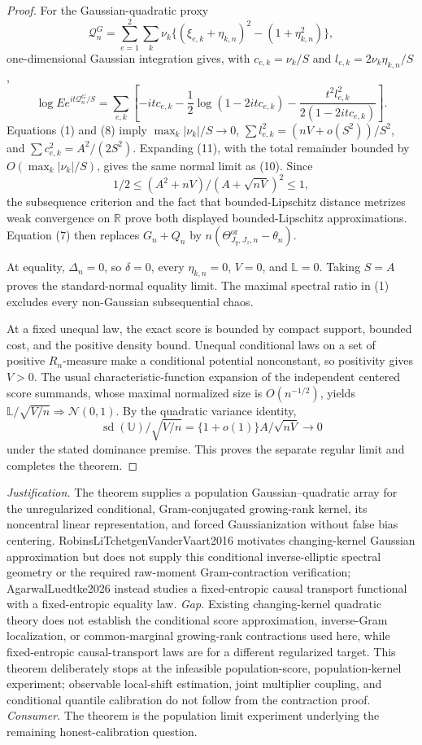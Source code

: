 \documentclass{article}
\begin{document}
\begin{proof}
For the Gaussian-quadratic proxy
\[
\mathcal Q_n^G=\sum_{e=1}^2\sum_k\nu_k
\{(\xi_{e,k}+\eta_{k,n})^2-(1+\eta_{k,n}^2)\},
\]
one-dimensional Gaussian integration gives, with \(c_{e,k}=\nu_k/S\) and \(l_{e,k}=2\nu_k\eta_{k,n}/S\),
\[
\log Ee^{it\mathcal Q_n^G/S}
=\sum_{e,k}\left[-itc_{e,k}-\frac12\log(1-2itc_{e,k})
-\frac{t^2l_{e,k}^2}{2(1-2itc_{e,k})}\right]. \tag{11}
\]
Equations (1) and (8) imply \(\max_k|\nu_k|/S\to0\), \(\sum l_{e,k}^2=(nV+o(S^2))/S^2\), and \(\sum c_{e,k}^2=A^2/(2S^2)\).  Expanding (11), with the total remainder bounded by \(O(\max_k|\nu_k|/S)\), gives the same normal limit as (10).  Since
\[
1/2\le(A^2+nV)/(A+\sqrt{nV})^2\le1, \tag{12}
\]
the subsequence criterion and the fact that bounded-Lipschitz distance metrizes weak convergence on \(\mathbb R\) prove both displayed bounded-Lipschitz approximations.  Equation (7) then replaces \(G_n+Q_n\) by \(n(\Theta^{\mathrm{or}}_{J_y,J_z,n}-\theta_n)\).

At equality, \(\Delta_n=0\), so \(\delta=0\), every \(\eta_{k,n}=0\), \(V=0\), and \(\mathbb L=0\).  Taking \(S=A\) proves the standard-normal equality limit.  The maximal spectral ratio in (1) excludes every non-Gaussian subsequential chaos.

At a fixed unequal law, the exact score is bounded by compact support, bounded cost, and the positive density bound.  Unequal conditional laws on a set of positive \(R_n\)-measure make a conditional potential nonconstant, so positivity gives \(V>0\).  The usual characteristic-function expansion of the independent centered score summands, whose maximal normalized size is \(O(n^{-1/2})\), yields \(\mathbb L/\sqrt{V/n}\Rightarrow\mathcal N(0,1)\).  By the quadratic variance identity,
\[
\operatorname{sd}(\mathbb U)/\sqrt{V/n}
=\{1+o(1)\}A/\sqrt{nV}\to0
\]
under the stated dominance premise.  This proves the separate regular limit and completes the theorem.
\end{proof}
\par\smallskip\noindent \textit{Justification.} The theorem supplies a population Gaussian--quadratic array for the unregularized conditional, Gram-conjugated growing-rank kernel, its noncentral linear representation, and forced Gaussianization without false bias centering. RobinsLiTchetgenVanderVaart2016 motivates changing-kernel Gaussian approximation but does not supply this conditional inverse-elliptic spectral geometry or the required raw-moment Gram-contraction verification; AgarwalLuedtke2026 instead studies a fixed-entropic causal transport functional with a fixed-entropic equality law. \textit{Gap.} Existing changing-kernel quadratic theory does not establish the conditional score approximation, inverse-Gram localization, or common-marginal growing-rank contractions used here, while fixed-entropic causal-transport laws are for a different regularized target. This theorem deliberately stops at the infeasible population-score, population-kernel experiment; observable local-shift estimation, joint multiplier coupling, and conditional quantile calibration do not follow from the contraction proof. \textit{Consumer.} The theorem is the population limit experiment underlying the remaining honest-calibration question.
\end{document}
